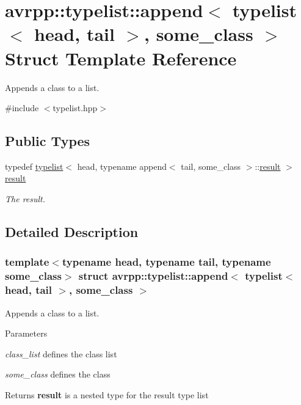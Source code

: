 \hypertarget{structavrpp_1_1typelist_1_1append_3_01typelist_3_01head_00_01tail_01_4_00_01some__class_01_4}{
\section{avrpp::typelist::append$<$ typelist$<$ head, tail $>$, some\_\-class $>$ Struct Template Reference}
\label{structavrpp_1_1typelist_1_1append_3_01typelist_3_01head_00_01tail_01_4_00_01some__class_01_4}
}


Appends a class to a list.  




{\ttfamily \#include $<$typelist.hpp$>$}

\subsection*{Public Types}
\begin{DoxyCompactItemize}
\item 
typedef \hyperlink{structavrpp_1_1typelist_1_1typelist}{typelist}$<$ head, typename append$<$ tail, some\_\-class $>$::\hyperlink{structavrpp_1_1typelist_1_1typelist}{result} $>$ \hyperlink{structavrpp_1_1typelist_1_1append_3_01typelist_3_01head_00_01tail_01_4_00_01some__class_01_4_afda2a6125cd10bf944aeb1c3f5d9e969}{result}
\begin{DoxyCompactList}\small\item\em The result. \item\end{DoxyCompactList}\end{DoxyCompactItemize}


\subsection{Detailed Description}
\subsubsection*{template$<$typename head, typename tail, typename some\_\-class$>$ struct avrpp::typelist::append$<$ typelist$<$ head, tail $>$, some\_\-class $>$}

Appends a class to a list. 
\begin{DoxyParams}{Parameters}
\item[{\em class\_\-list}]defines the class list \item[{\em some\_\-class}]defines the class \end{DoxyParams}
\begin{DoxyReturn}{Returns}
{\bfseries result} is a nested type for the result type list 
\end{DoxyReturn}


